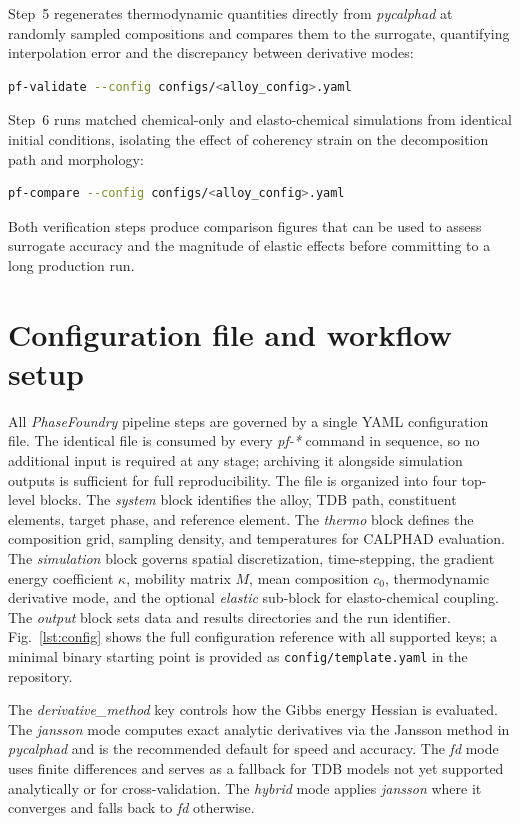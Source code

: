\documentclass[12pt]{article}
\begin{document}
Step~5 regenerates thermodynamic quantities directly from \textit{pycalphad} at randomly sampled compositions and compares them to the surrogate, quantifying interpolation error and the discrepancy between derivative modes:
\begin{lstlisting}[language=bash]
pf-validate --config configs/<alloy_config>.yaml
\end{lstlisting}
Step~6 runs matched chemical-only and elasto-chemical simulations from identical initial conditions, isolating the effect of coherency strain on the decomposition path and morphology:
\begin{lstlisting}[language=bash]
pf-compare --config configs/<alloy_config>.yaml
\end{lstlisting}
Both verification steps produce comparison figures that can be used to assess surrogate accuracy and the magnitude of elastic effects before committing to a long production run.



\section{Configuration file and workflow setup}
\label{sec:config}

All \textit{PhaseFoundry} pipeline steps are governed by a single YAML configuration file. The identical file is consumed by every \emph{pf-*} command in sequence, so no additional input is required at any stage; archiving it alongside simulation outputs is sufficient for full reproducibility. The file is organized into four top-level blocks. The \emph{system} block identifies the alloy, TDB path, constituent elements, target phase, and reference element. The \emph{thermo} block defines the composition grid, sampling density, and temperatures for CALPHAD evaluation. The \emph{simulation} block governs spatial discretization, time-stepping, the gradient energy coefficient $\kappa$, mobility matrix $M$, mean composition $c_0$, thermodynamic derivative mode, and the optional \emph{elastic} sub-block for elasto-chemical coupling. The \emph{output} block sets data and results directories and the run identifier. Fig.~\ref{lst:config} shows the full configuration reference with all supported keys; a minimal binary starting point is provided as \texttt{config/template.yaml} in the repository.

The \emph{derivative\_method} key controls how the Gibbs energy Hessian is evaluated. The \emph{jansson} mode computes exact analytic derivatives via the Jansson method in \textit{pycalphad} and is the recommended default for speed and accuracy. The \emph{fd} mode uses finite differences and serves as a fallback for TDB models not yet supported analytically or for cross-validation. The \emph{hybrid} mode applies \emph{jansson} where it converges and falls back to \emph{fd} otherwise.
\end{document}
